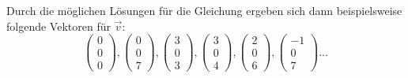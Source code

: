\documentclass{article}
\begin{document}
\begin{enumerate}
    Durch die möglichen Lösungen für die Gleichung ergeben sich dann beispielsweise folgende Vektoren für $\overrightarrow{v}$:
    \[
        \begin{pmatrix}
            0 \\ 0 \\ 0
        \end{pmatrix},
        \begin{pmatrix}
            0 \\ 0 \\ 7
        \end{pmatrix},
        \begin{pmatrix}
            3 \\ 0 \\ 3
        \end{pmatrix},
        \begin{pmatrix}
            3 \\ 0 \\ 4
        \end{pmatrix},
        \begin{pmatrix}
            2 \\ 0 \\ 6
        \end{pmatrix},
        \begin{pmatrix}
            -1 \\ 0 \\ 7
        \end{pmatrix} \dots
    \]
\end{enumerate}
\end{document}
